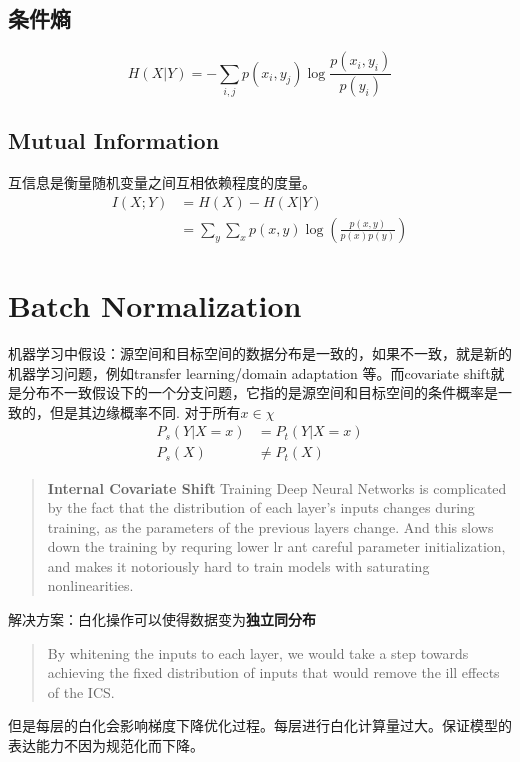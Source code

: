 \subsection{条件熵}
\begin{equation}
    H(X|Y) = -\sum_{i,j}p(x_i, y_j)\log \frac{p(x_i, y_i)}{p(y_i)}
\end{equation}

\subsection{Mutual Information}
互信息是衡量随机变量之间互相依赖程度的度量。
\begin{equation}
    \begin{split}
        I(X;Y) &= H(X) - H(X|Y) \\
        &=\sum_y\sum_x p(x, y)\log(\frac{p(x, y)}{p(x)p(y)})
    \end{split}
\end{equation}

\section{Batch Normalization}
机器学习中假设：源空间和目标空间的数据分布是一致的，如果不一致，就是新的机器学习问题，例如transfer learning/domain adaptation
等。而covariate shift就是分布不一致假设下的一个分支问题，它指的是源空间和目标空间的条件概率是一致的，但是其边缘概率不同.
对于所有$x \in \chi $
\begin{equation}
    \begin{split}
        P_s(Y|X = x) &= P_t(Y|X = x) \\
        P_s(X) &\neq P_t(X)
    \end{split}
\end{equation}
\begin{quotation}
    \textbf{Internal Covariate Shift} Training Deep Neural Networks is complicated by the fact that the distribution of each layer's inputs
changes during training, as the parameters of the previous layers change. And this slows down the training
by requring lower lr ant careful parameter initialization, and makes it notoriously hard to train models
with saturating nonlinearities.
\end{quotation}
解决方案：白化操作可以使得数据变为\textbf{独立同分布}
\begin{quotation}
    By whitening the inputs to each layer, we would take a step towards achieving the fixed distribution
    of inputs that would remove the ill effects of the ICS.
\end{quotation}
但是每层的白化会影响梯度下降优化过程。每层进行白化计算量过大。保证模型的表达能力不因为规范化而下降。

